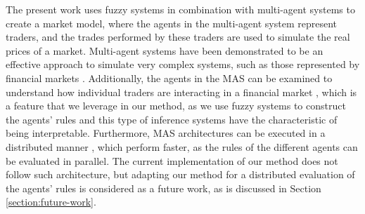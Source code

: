 \documentclass{ieeeaccess}
\begin{document}
The present work uses fuzzy systems in combination with multi-agent
systems to create a market model, where the agents in the
multi-agent system represent traders, and the trades performed by
these traders are used to simulate the real prices of a market.
Multi-agent systems have been demonstrated to be an effective
approach to simulate very complex systems, such as those represented
by financial markets \cite{Lebaron2001,Grothmann2002,Li2014,Chen2004,Kim2018}.
Additionally, the agents in the MAS can be examined to understand how individual traders are
interacting in a financial market \cite{Wei2014} \cite{Rajab2019},
which is a feature that we leverage in our method, as we use fuzzy
systems to construct the agents' rules and this type of inference
systems have the characteristic of being interpretable. %
Furthermore, MAS architectures can be executed in a distributed manner
\cite{Gao2019} \cite{Yu2015} \cite{Yu2015}, which perform faster, as the rules
of the different agents can be evaluated in parallel. The current
implementation of our method does not follow such architecture, but
adapting our method for a distributed evaluation of the agents' rules
is considered as a future work, as is discussed in Section
\ref{section:future-work}.
\end{document}
